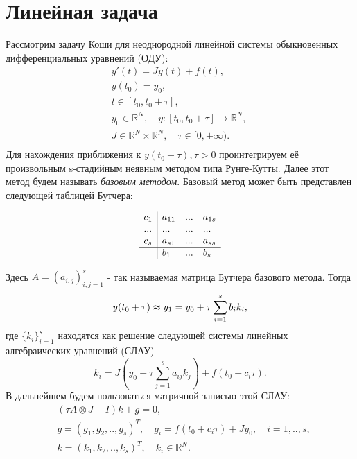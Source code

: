 \documentclass[a4paper,12pt]{report}
\begin{document}
  \section{Линейная задача}
  \label{s:linear_problem}
Рассмотрим задачу Коши для неоднородной линейной системы обыкновенных дифференциальных уравнений (ОДУ):
	\begin{equation}
	\begin{aligned}
	\label{main_problem}
	&y'(t)=Jy(t)+f(t),\\
	&y(t_0)=y_0,\\
	&t \in [t_0, t_0+\tau],\quad \\
	&y_0\in \mathbb{R}^N,\quad
	y:[t_0,t_0+\tau] \to \mathbb{R}^N,\quad\\
	&J \in \mathbb{R}^N \times \mathbb{R}^N, \quad
	\tau \in [0, +\infty).\\
	\end{aligned}
	\end{equation} 
Для нахождения приближения к $y(t_0 + \tau), \tau > 0$ проинтегрируем её произвольным s-стадийным неявным методом типа Рунге-Кутты. Далее этот метод будем называть \textit{базовым методом}. Базовый метод может быть представлен следующей таблицей Бутчера:
	\begin{center}
	\begin{equation}
	\label{base_method}
	\begin{array}{l|lll}
	c_1& a_{11}& ...& a_{1s}\\
	...& ...& ...& ...\\
	c_s& a_{s1}& ...& a_{ss}\\
	\hline
	& b_1& ...& b_s\\
	\end{array}
	\end{equation}
	\end{center}
Здесь $A=(a_{i,j})_{i,j=1}^s$ - так называемая матрица Бутчера
базового метода. Тогда
	$$ y(t_0+\tau)\thickapprox y_1=y_0+\tau\sum_{i=1}^sb_ik_i,$$
где $\{k_i\}_{i=1}^s$ находятся как решение следующей системы линейных алгебраических уравнений (СЛАУ)
	$$k_i = J(y_0+\tau\sum_{j=1}^sa_{ij}k_j)+f(t_0+c_i\tau).$$
В дальнейшем будем пользоваться матричной записью этой СЛАУ:
	\begin{equation}\label{system_for_solving}
	\begin{aligned}
	&(\tau A\otimes J-I)k+g=0,\\
	&g=(g_1,g_2,..,g_s)^T, \quad g_i=f(t_0+c_i \tau)+Jy_0, \quad i=1,..,s,\\
	&k=(k_1,k_2,..,k_s)^T, \quad k_i \in \mathbb{R}^N.\\
	\end{aligned}
	\end{equation}
\end{document}
